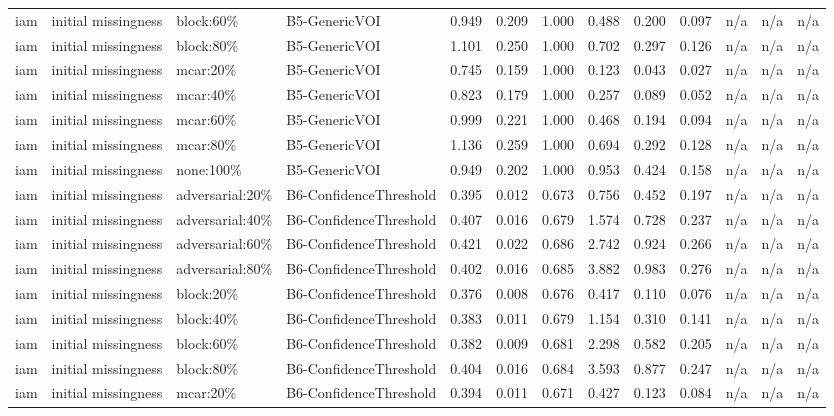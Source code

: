 \begin{table}[!ht]
{\begin{tabular}{lllllllllllll}
iam & initial missingness & block:60\% & B5-GenericVOI & 0.949 & 0.209 & 1.000 & 0.488 & 0.200 & 0.097 & n/a & n/a & n/a \\
iam & initial missingness & block:80\% & B5-GenericVOI & 1.101 & 0.250 & 1.000 & 0.702 & 0.297 & 0.126 & n/a & n/a & n/a \\
iam & initial missingness & mcar:20\% & B5-GenericVOI & 0.745 & 0.159 & 1.000 & 0.123 & 0.043 & 0.027 & n/a & n/a & n/a \\
iam & initial missingness & mcar:40\% & B5-GenericVOI & 0.823 & 0.179 & 1.000 & 0.257 & 0.089 & 0.052 & n/a & n/a & n/a \\
iam & initial missingness & mcar:60\% & B5-GenericVOI & 0.999 & 0.221 & 1.000 & 0.468 & 0.194 & 0.094 & n/a & n/a & n/a \\
iam & initial missingness & mcar:80\% & B5-GenericVOI & 1.136 & 0.259 & 1.000 & 0.694 & 0.292 & 0.128 & n/a & n/a & n/a \\
iam & initial missingness & none:100\% & B5-GenericVOI & 0.949 & 0.202 & 1.000 & 0.953 & 0.424 & 0.158 & n/a & n/a & n/a \\
iam & initial missingness & adversarial:20\% & B6-ConfidenceThreshold & 0.395 & 0.012 & 0.673 & 0.756 & 0.452 & 0.197 & n/a & n/a & n/a \\
iam & initial missingness & adversarial:40\% & B6-ConfidenceThreshold & 0.407 & 0.016 & 0.679 & 1.574 & 0.728 & 0.237 & n/a & n/a & n/a \\
iam & initial missingness & adversarial:60\% & B6-ConfidenceThreshold & 0.421 & 0.022 & 0.686 & 2.742 & 0.924 & 0.266 & n/a & n/a & n/a \\
iam & initial missingness & adversarial:80\% & B6-ConfidenceThreshold & 0.402 & 0.016 & 0.685 & 3.882 & 0.983 & 0.276 & n/a & n/a & n/a \\
iam & initial missingness & block:20\% & B6-ConfidenceThreshold & 0.376 & 0.008 & 0.676 & 0.417 & 0.110 & 0.076 & n/a & n/a & n/a \\
iam & initial missingness & block:40\% & B6-ConfidenceThreshold & 0.383 & 0.011 & 0.679 & 1.154 & 0.310 & 0.141 & n/a & n/a & n/a \\
iam & initial missingness & block:60\% & B6-ConfidenceThreshold & 0.382 & 0.009 & 0.681 & 2.298 & 0.582 & 0.205 & n/a & n/a & n/a \\
iam & initial missingness & block:80\% & B6-ConfidenceThreshold & 0.404 & 0.016 & 0.684 & 3.593 & 0.877 & 0.247 & n/a & n/a & n/a \\
iam & initial missingness & mcar:20\% & B6-ConfidenceThreshold & 0.394 & 0.011 & 0.671 & 0.427 & 0.123 & 0.084 & n/a & n/a & n/a \\

\end{tabular}}
\end{table}
